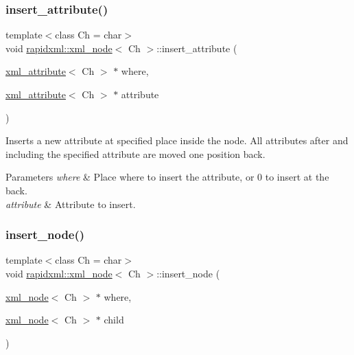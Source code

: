 \subsubsection{\texorpdfstring{insert\+\_\+attribute()}{insert\_attribute()}\hspace{0.1cm}{\footnotesize\ttfamily [2/2]}}
{\footnotesize\ttfamily template$<$class Ch = char$>$ \\
void \mbox{\hyperlink{classrapidxml_1_1xml__node}{rapidxml\+::xml\+\_\+node}}$<$ Ch $>$\+::insert\+\_\+attribute (\begin{DoxyParamCaption}\item[{\mbox{\hyperlink{classrapidxml_1_1xml__attribute}{xml\+\_\+attribute}}$<$ Ch $>$ $\ast$}]{where,  }\item[{\mbox{\hyperlink{classrapidxml_1_1xml__attribute}{xml\+\_\+attribute}}$<$ Ch $>$ $\ast$}]{attribute }\end{DoxyParamCaption})\hspace{0.3cm}{\ttfamily [inline]}}

Inserts a new attribute at specified place inside the node. All attributes after and including the specified attribute are moved one position back. 
\begin{DoxyParams}{Parameters}
{\em where} & Place where to insert the attribute, or 0 to insert at the back. \\
\hline
{\em attribute} & Attribute to insert. \\
\hline
\end{DoxyParams}
\mbox{\label{classrapidxml_1_1xml__node_a666880f42a7e486d78cc45ed51c7c46d}} 
\subsubsection{\texorpdfstring{insert\+\_\+node()}{insert\_node()}\hspace{0.1cm}{\footnotesize\ttfamily [1/2]}}
{\footnotesize\ttfamily template$<$class Ch = char$>$ \\
void \mbox{\hyperlink{classrapidxml_1_1xml__node}{rapidxml\+::xml\+\_\+node}}$<$ Ch $>$\+::insert\+\_\+node (\begin{DoxyParamCaption}\item[{\mbox{\hyperlink{classrapidxml_1_1xml__node}{xml\+\_\+node}}$<$ Ch $>$ $\ast$}]{where,  }\item[{\mbox{\hyperlink{classrapidxml_1_1xml__node}{xml\+\_\+node}}$<$ Ch $>$ $\ast$}]{child }\end{DoxyParamCaption})\hspace{0.3cm}{\ttfamily [inline]}}

